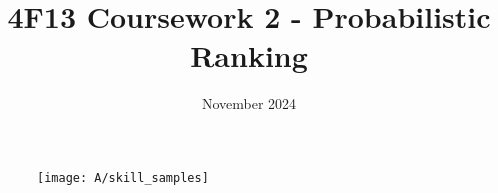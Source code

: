 \documentclass[11pt]{article}
\title{\vspace{-2cm}4F13 Coursework 2 - Probabilistic Ranking}
\author{}
\date{November 2024}
\begin{document}
% 

\setcounter{page}{1}

\maketitle

\begin{figure}[h]
    \centering
    \texttt{[image: A/skill\_samples]} 
\end{figure}
\end{document}
